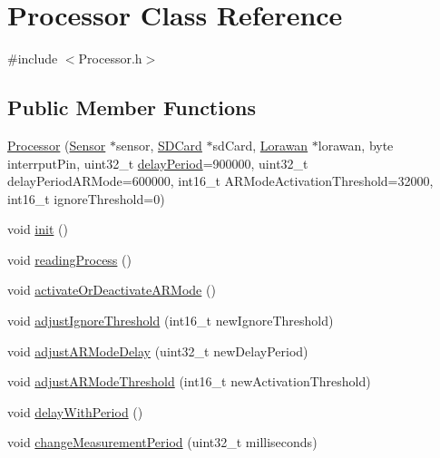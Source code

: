 \hypertarget{class_processor}{}\section{Processor Class Reference}
\label{class_processor}


{\ttfamily \#include $<$Processor.\+h$>$}

\subsection*{Public Member Functions}
\begin{DoxyCompactItemize}
\item 
\mbox{\hyperlink{class_processor_a7f78050cf9700a4247df15a1eed5f88c}{Processor}} (\mbox{\hyperlink{class_sensor}{Sensor}} $\ast$sensor, \mbox{\hyperlink{class_s_d_card}{S\+D\+Card}} $\ast$sd\+Card, \mbox{\hyperlink{class_lorawan}{Lorawan}} $\ast$lorawan, byte interrput\+Pin, uint32\+\_\+t \mbox{\hyperlink{class_processor_a3d4df57c57607d2ed3ad9f2d4ff3e789}{delay\+Period}}=900000, uint32\+\_\+t delay\+Period\+A\+R\+Mode=600000, int16\+\_\+t A\+R\+Mode\+Activation\+Threshold=32000, int16\+\_\+t ignore\+Threshold=0)
\item 
void \mbox{\hyperlink{class_processor_a22e869ee49d974ad0ee7ee81961ab88f}{init}} ()
\item 
void \mbox{\hyperlink{class_processor_a694b889c3c6f8c09b998b4012d304d6e}{reading\+Process}} ()
\item 
void \mbox{\hyperlink{class_processor_a9316beb5903476939018dce45e992c53}{activate\+Or\+Deactivate\+A\+R\+Mode}} ()
\item 
void \mbox{\hyperlink{class_processor_a4b4e65040fd7bc17e978412c1af8e0c8}{adjust\+Ignore\+Threshold}} (int16\+\_\+t new\+Ignore\+Threshold)
\item 
void \mbox{\hyperlink{class_processor_a5b6762cf2679f4f47365aacb47b59ef5}{adjust\+A\+R\+Mode\+Delay}} (uint32\+\_\+t new\+Delay\+Period)
\item 
void \mbox{\hyperlink{class_processor_a58a2f6a482491cb003f4ff1bd45ba891}{adjust\+A\+R\+Mode\+Threshold}} (int16\+\_\+t new\+Activation\+Threshold)
\item 
void \mbox{\hyperlink{class_processor_a6ad79126a7694ed86f3f5ccc36b606bd}{delay\+With\+Period}} ()
\item 
void \mbox{\hyperlink{class_processor_a8759b7d9dc2d5f63fa9ca08f9211fd77}{change\+Measurement\+Period}} (uint32\+\_\+t milliseconds)
\item 

\end{DoxyCompactItemize}
